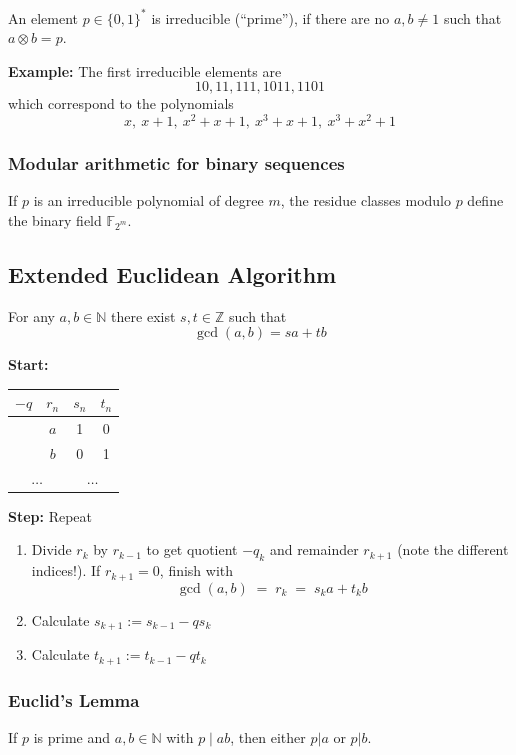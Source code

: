 \documentclass[a4paper]{scrartcl}
\newcommand\N{\mathbb N}
\newcommand\Z{\mathbb Z}
\newcommand\F{\mathbb F}
\begin{document}
An element $p\in\{0,1\}^*$ is irreducible (``prime''), if there are no $a,b\neq1$ such
that $a\otimes b=p$.

\textbf{Example:} The first irreducible elements are
\[10, 11, 111, 1011, 1101\]
which correspond to the polynomials
\[x,\ x+1,\ x^2+x+1,\ x^3+x+1,\ x^3+x^2+1\]

\subsubsection{Modular arithmetic for binary sequences}

If $p$ is an irreducible polynomial of degree $m$, the residue classes modulo $p$
define the binary field $\F_{2^m}$.

\subsection{Extended Euclidean Algorithm}


\label{eea}

For any $a,b\in\N$ there exist $s,t\in\Z$ such that\[\gcd(a,b)=sa+tb\]

\textbf{Start:}
\begin{center}
    \begin{tabular}{cc|cc}
        $-q$ & $r_n$ & $s_n$ & $t_n$ \\ 
        \hline
            & $a$ & 1 & 0 \\
            & $b$ & 0 & 1\\
        \multicolumn{2}{c}{$\hdots$}& \multicolumn{2}{c}{$\hdots$}
    \end{tabular}
\end{center}

\textbf{Step:} Repeat
\begin{enumerate}
    \item Divide $r_k$ by $r_{k-1}$ to get quotient $-q_k$ and remainder $r_{k+1}$
        (note the different indices!). If $r_{k+1} = 0$, finish with
        \[\gcd(a,b)\;=\;r_k\;=\;s_ka+t_kb\]
    \item Calculate $s_{k+1} := s_{k-1}-qs_k$
    \item Calculate $t_{k+1} := t_{k-1}-qt_k$
\end{enumerate}

\subsubsection{Euclid's Lemma}

If $p$ is prime and $a,b\in\N$ with $p\mid ab$, then either $p|a$ or $p|b$.
\end{document}
